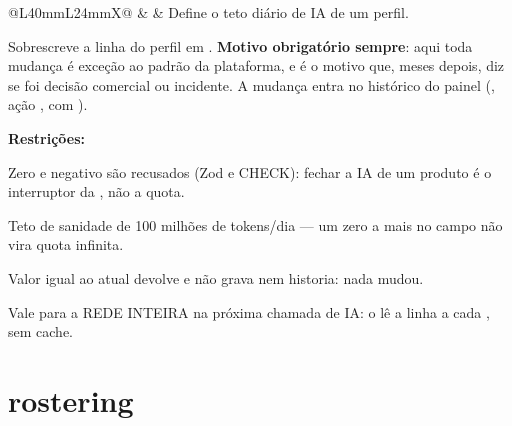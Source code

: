 \begin{tabularx}{\linewidth}{@{}L{40mm}L{24mm}X@{}}
\zebra {} &  & Define o teto diário de IA de um perfil.\par Sobrescreve a linha do perfil em . \textbf{Motivo obrigatório sempre}: aqui toda mudança é exceção ao padrão da plataforma, e é o motivo que, meses depois, diz se foi decisão comercial ou incidente. A mudança entra no histórico do painel (, ação , com ).\par \textbf{Restrições:}\par \hspace*{1em}\textbullet{} Zero e negativo são recusados (Zod e CHECK): fechar a IA de um produto é o interruptor da , não a quota.\par \hspace*{1em}\textbullet{} Teto de sanidade de 100 milhões de tokens/dia --- um zero a mais no campo não vira quota infinita.\par \hspace*{1em}\textbullet{} Valor igual ao atual devolve  e não grava nem historia: nada mudou.\par \hspace*{1em}\textbullet{} Vale para a REDE INTEIRA na próxima chamada de IA: o  lê a linha a cada , sem cache.\\
\bottomrule
\end{tabularx}

\section{rostering}

